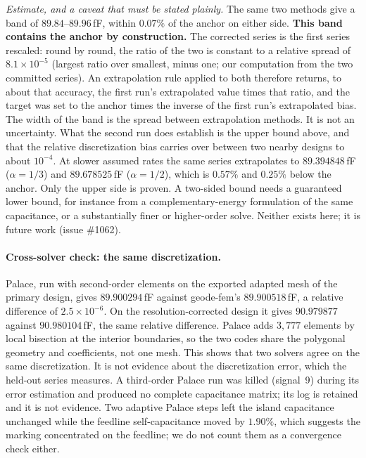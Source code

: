 \documentclass{anvil-paper}
\begin{document}
\emph{Estimate, and a caveat that must be stated plainly.} The same two
methods give a band of $89.84$--$89.96$\,fF, within $0.07\%$ of the
anchor on either side. \textbf{This band contains the anchor by
construction.} The corrected series is the first series rescaled:
round by round, the ratio of the two is constant to a relative spread
of $8.1\times10^{-5}$ (largest ratio over smallest, minus one; our
computation from the two committed series). An
extrapolation rule applied to both therefore returns, to about that
accuracy, the first run's extrapolated value times that ratio, and the
target was set to the
anchor times the inverse of the first run's extrapolated bias. The
width of the band is the spread between extrapolation methods. It is
not an uncertainty. What the second run does establish is the upper
bound above, and that the relative discretization bias carries over
between two nearby designs to about $10^{-4}$. At slower assumed rates
the same series extrapolates to $89.394848$\,fF ($\alpha = 1/3$) and
$89.678525$\,fF ($\alpha = 1/2$), which is $0.57\%$ and $0.25\%$ below
the anchor. Only the upper side is proven. A two-sided bound needs a
guaranteed lower bound, for instance from a complementary-energy
formulation of the same capacitance, or a substantially finer or
higher-order solve. Neither exists here; it is future work (issue
\#1062).

\paragraph{Cross-solver check: the same discretization.}
Palace, run with second-order elements on the exported adapted mesh of
the primary design, gives $89.900294$\,fF against geode-fem's
$89.900518$\,fF, a relative difference of $2.5\times10^{-6}$. On the
resolution-corrected design it gives $90.979877$ against
$90.980104$\,fF, the same relative difference. Palace adds $3{,}777$
elements by local bisection at the interior boundaries, so the two
codes share the polygonal geometry and coefficients, not one mesh. This shows that two solvers agree on the same discretization. It
is not evidence about the discretization error, which the held-out
series measures. A third-order Palace run was killed (signal~9) during
its error estimation and produced no complete capacitance matrix; its
log is retained and it is not evidence. Two adaptive Palace steps left
the island capacitance unchanged while the feedline self-capacitance
moved by $1.90\%$, which suggests the marking concentrated on the
feedline; we do not count them as a convergence check either.
\end{document}
